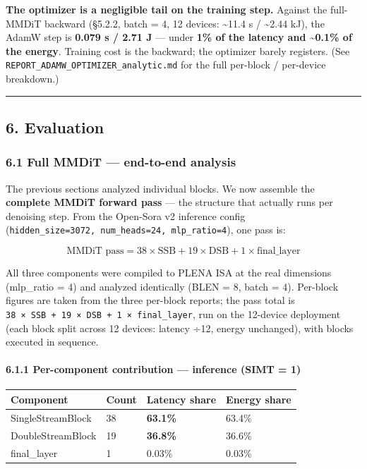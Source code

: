 \documentclass[
  10pt,
]{article}
\newcounter{none} %
\begin{document}
\textbf{The optimizer is a negligible tail on the training step.} Against
the full-MMDiT backward (§5.2.2, batch = 4, 12 devices: \textasciitilde11.4 s
/ \textasciitilde2.44 kJ), the AdamW step is \textbf{0.079 s / 2.71 J} —
under \textbf{1\% of the latency and \textasciitilde0.1\% of the energy}.
Training cost is the backward; the optimizer barely registers. (See
\texttt{REPORT\_ADAMW\_OPTIMIZER\_analytic.md} for the full per-block /
per-device breakdown.)

\begin{center}\rule{0.5\linewidth}{0.5pt}\end{center}

\subsection{6. Evaluation}\label{evaluation}

\subsubsection{6.1 Full MMDiT --- end-to-end
analysis}\label{full-mmdit-end-to-end-analysis}

The previous sections analyzed individual blocks. We now assemble the
\textbf{complete MMDiT forward pass} --- the structure that actually
runs per denoising step. From the Open-Sora v2 inference config
(\texttt{hidden\_size=3072,\ num\_heads=24,\ mlp\_ratio=4}), one pass
is:

\[\text{MMDiT pass} = 38 \times \text{SSB} + 19 \times \text{DSB} + 1 \times \text{final\_layer}\]

All three components were compiled to PLENA ISA at the real dimensions
(mlp\_ratio = 4) and analyzed identically (BLEN = 8, batch = 4).
Per-block figures are taken from the three per-block reports; the pass
total is \texttt{38\ ×\ SSB\ +\ 19\ ×\ DSB\ +\ 1\ ×\ final\_layer}, run
on the 12-device deployment (each block split across 12 devices: latency
÷12, energy unchanged), with blocks executed in sequence.

\paragraph{6.1.1 Per-component contribution --- inference (SIMT =
1)}\label{per-component-contribution-simt-1}

{\def\LTcaptype{none} %
\begin{longtable}[]{@{}llll@{}}
\toprule\noalign{}
Component & Count & Latency share & Energy share \\
\midrule\noalign{}
\endhead
\bottomrule\noalign{}
\endlastfoot
SingleStreamBlock & 38 & \textbf{63.1\%} & 63.4\% \\
DoubleStreamBlock & 19 & \textbf{36.8\%} & 36.6\% \\
final\_layer & 1 & 0.03\% & 0.03\% \\
\end{longtable}
}
\end{document}
